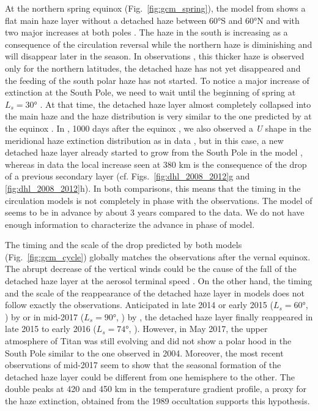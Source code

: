 At the northern spring equinox (Fig.~\ref{fig:gcm_spring}), the model from \cite{Lebonnois2012} shows a
flat main haze layer without a detached haze between \ang{60}S and \ang{60}N and with two major increases at both poles .
The haze in the south is increasing as a consequence of the circulation reversal while the northern haze is diminishing
and will disappear later in the season. In observations ,
this thicker haze is observed only for the northern latitudes, the detached haze has not yet disappeared
and the feeding of the south polar haze has not started. To notice a major increase of extinction at the South Pole,
we need to wait until the beginning of spring at $L_s = \ang{30}$ .
At that time, the detached haze layer almost completely collapsed into the main haze and the haze distribution is very
similar to the one predicted by \cite{Lebonnois2012} at the equinox .
In \cite{Larson2015}, 1000 days after the equinox , we also observed a \emph{U} shape in the meridional haze extinction distribution as in data , but in this case, a new detached haze layer already started to grow from the South Pole in the model , whereas in data  the local increase seen at 380 km is the consequence of the drop of a previous secondary layer (cf. Figs.~\ref{fig:dhl_2008_2012}g and \ref{fig:dhl_2008_2012}h).
In both comparisons, this means that the timing in the circulation models is not completely in phase with the observations.
The model of \cite{Lebonnois2012} seems to be in advance by about 3 years compared to the data.
We do not have enough information to characterize the advance in phase of \cite{Larson2015} model.

The timing and the scale of the drop predicted by both models (Fig.~\ref{fig:gcm_cycle}) globally matches
the observations after the vernal equinox. The abrupt decrease of the vertical winds could be the cause of the fall of
the detached haze layer at the aerosol terminal speed \citep{West2018}.
On the other hand, the timing and the scale of the reappearance of the detached haze layer in models does not follow exactly the observations.
Anticipated in late 2014 or early 2015 ($L_s = \ang{60}$, ) by \cite{Larson2015} or in mid-2017 ($L_s = \ang{90}$, ) by \cite{Lebonnois2012}, the detached haze layer
finally reappeared in late 2015 to early 2016 ($L_s = \ang{74}$, ).
However, in May 2017, the upper atmosphere of Titan was still evolving and did not show a polar hood in the South Pole
similar to the one observed in 2004. Moreover, the most recent observations of mid-2017 seem to show that the seasonal
formation of the detached haze layer could be different from one hemisphere to the other. The double peaks at
420 and 450 km in the temperature gradient profile, a proxy for the haze extinction, obtained from the 1989
occultation \citep{Sicardy1999} supports this hypothesis.

